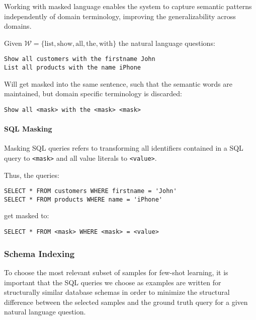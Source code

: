Working with masked language enables the system to capture semantic patterns
independently of domain terminology, improving the generalizability across
domains.

Given $\mathcal{W} = \{\text{list}, \text{show}, \text{all}, \text{the},
\text{with}\}$ the natural language
questions:

\begin{verbatim}
Show all customers with the firstname John
List all products with the name iPhone
\end{verbatim}

Will get masked into the same sentence, such that the semantic words are
maintained, but domain specific terminology is discarded:

\begin{verbatim}
Show all <mask> with the <mask> <mask>
\end{verbatim}

\paragraph{SQL Masking}\label{design:sql-masking}

Masking SQL queries refers to transforming all identifiers contained in 
a SQL query to \texttt{<mask>} and all value literals to \texttt{<value>}.

Thus, the queries:

\begin{verbatim}
SELECT * FROM customers WHERE firstname = 'John'
SELECT * FROM products WHERE name = 'iPhone'
\end{verbatim}

get masked to:

\begin{verbatim}
SELECT * FROM <mask> WHERE <mask> = <value>
\end{verbatim}



\subsubsection{Schema Indexing}

To choose the most relevant subset of samples for few-shot learning,
it is important that the SQL queries we choose as examples are written for
structurally similar database schemas in order to minimize the structural
difference between the selected samples and the ground truth query for a given
natural language question.

